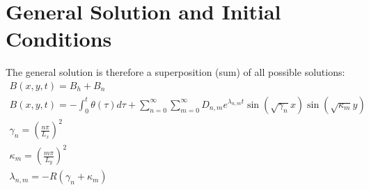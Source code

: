 \documentclass[11pt]{article}
\begin{document}
\section{General Solution and Initial Conditions}
The general solution is therefore a superposition (sum) of all possible solutions:
\begin{equation}\begin{aligned}
B(x,y,t) = B_h + B_n \\
B(x,y,t) = - \int_0^t \theta(\tau) d\tau +
\sum_{n=0}^{\infty} \sum_{m=0}^{\infty}
D_{n,m} e^{\lambda_{n,m} t} \sin(\sqrt{\gamma_n} x) \sin(\sqrt{\kappa_{m}} y)
 \\
 \gamma_n = \left( \frac{n\pi}{L_x} \right)^2 \\
 \kappa_{m} = \left( \frac{m\pi}{L_y} \right)^2 \\
 \lambda_{n,m} = - R \left( \gamma_n + \kappa_{m} \right) \\
\end{aligned} \end{equation}
\end{document}
